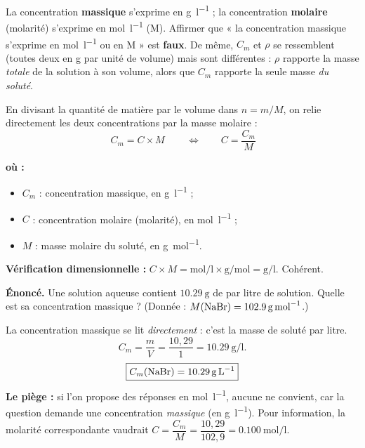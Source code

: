 \documentclass[11pt,a4paper]{article}
\newenvironment{ou}{%
  \par\smallskip\noindent\textbf{où :}\nopagebreak
  \begin{itemize}[leftmargin=1.8em,topsep=2pt,itemsep=1.5pt,parsep=0pt]}%
  {\end{itemize}}
\begin{document}
\begin{attention}
La concentration \textbf{massique} s'exprime en \si{\gram\per\litre} ; la concentration
\textbf{molaire} (molarité) s'exprime en \si{\mole\per\litre} (M). Affirmer que « la concentration
massique s'exprime en \si{\mole\per\litre} ou en M » est \textbf{faux}. De même, $C_m$ et $\rho$ se
ressemblent (toutes deux en g par unité de volume) mais sont différentes : $\rho$ rapporte la masse
\emph{totale} de la solution à son volume, alors que $C_m$ rapporte la seule masse \emph{du soluté}.
\end{attention}

\begin{formule}
En divisant la quantité de matière par le volume dans $n = m/M$, on relie directement les deux
concentrations par la masse molaire :
\[ \boxed{\,C_m = C \times M\,}\qquad\Longleftrightarrow\qquad C = \dfrac{C_m}{M} \]
\begin{ou}
  \item $C_m$ : concentration massique, en \si{\gram\per\litre} ;
  \item $C$ : concentration molaire (molarité), en \si{\mole\per\litre} ;
  \item $M$ : masse molaire du soluté, en \si{\gram\per\mole}.
\end{ou}
\textbf{Vérification dimensionnelle :} $C\times M = \si{\mole\per\litre}\times\si{\gram\per\mole}
= \si{\gram\per\litre}$. Cohérent.
\end{formule}

\begin{exemple}
\textbf{Énoncé.} Une solution aqueuse contient $\SI{10.29}{\gram}$ de  par litre de solution.
Quelle est sa concentration massique ? (Donnée : $M(\ce{NaBr}) = \SI{102.9}{\gram\per\mole}$.)

\smallskip
La concentration massique se lit \emph{directement} : c'est la masse de soluté par litre.
\[ C_m = \frac{m}{V} = \frac{10{,}29}{1} = \SI{10.29}{\gram\per\litre}. \]
\[ \boxed{C_m(\ce{NaBr}) = \SI{10.29}{\gram\per\litre}} \]
\textbf{Le piège :} si l'on propose des réponses en \si{\mole\per\litre}, aucune ne convient, car la
question demande une concentration \emph{massique} (en \si{\gram\per\litre}). Pour information, la
molarité correspondante vaudrait $C = \dfrac{C_m}{M} = \dfrac{10{,}29}{102{,}9} = \SI{0.100}{\mole\per\litre}$.
\end{exemple}
\end{document}
